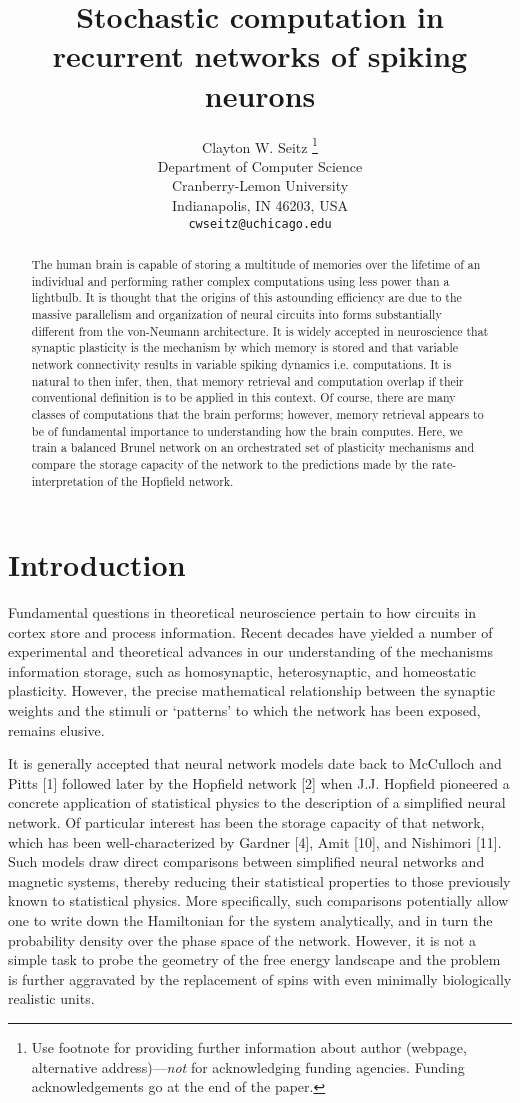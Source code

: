\documentclass{article} %
\title{Stochastic computation in recurrent networks of spiking neurons}
\author{Clayton W. Seitz \thanks{ Use footnote for providing further information
about author (webpage, alternative address)---\emph{not} for acknowledging
funding agencies.  Funding acknowledgements go at the end of the paper.} \\
Department of Computer Science\\
Cranberry-Lemon University\\
Indianapolis, IN 46203, USA \\
\texttt{cwseitz@uchicago.edu} \\
}
\begin{document}
\maketitle

\begin{abstract}
The human brain is capable of storing a multitude of memories over the lifetime of an individual and performing rather complex computations using less power than a lightbulb. It is thought that the origins of this astounding efficiency are due to the massive parallelism and organization of neural circuits into forms substantially different from the von-Neumann architecture. It is widely accepted in neuroscience that synaptic plasticity is the mechanism by which memory is stored and that variable network connectivity results in variable spiking dynamics i.e. computations. It is natural to then infer, then, that memory retrieval and computation overlap if their conventional definition is to be applied in this context. Of course, there are many classes of computations that the brain performs; however, memory retrieval appears to be of fundamental importance to understanding how the brain computes. Here, we train a balanced Brunel network on an orchestrated set of plasticity mechanisms and compare the storage capacity of the network to the predictions made by the rate-interpretation of the Hopfield network.
\end{abstract}

\section{Introduction}

Fundamental questions in theoretical neuroscience pertain to how circuits in cortex store and process information. Recent decades have yielded a number of experimental and theoretical advances in our understanding of the mechanisms information storage, such as homosynaptic, heterosynaptic, and homeostatic plasticity. However, the precise mathematical relationship between the synaptic weights and the stimuli or `patterns' to which the network has been exposed, remains elusive. 

It is generally accepted that neural network models date back to McCulloch and Pitts [1] followed later by the Hopfield network [2] when J.J. Hopfield pioneered a concrete application of statistical physics to the description of a simplified neural network. Of particular interest has been the storage capacity of that network, which has been well-characterized by Gardner [4], Amit [10], and Nishimori [11]. Such models draw direct comparisons between simplified neural networks and magnetic systems, thereby reducing their statistical properties to those previously known to statistical physics. More specifically, such comparisons potentially allow one to write down the Hamiltonian for the system analytically, and in turn the probability density over the phase space of the network. However, it is not a simple task to probe the geometry of the free energy landscape and the problem is further aggravated by the replacement of spins with even minimally biologically realistic units. 
\end{document}
